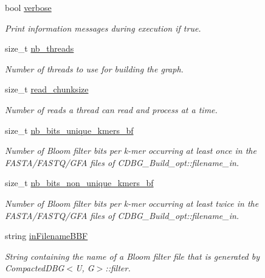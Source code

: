 \begin{DoxyCompactItemize}
\item 
bool \hyperlink{structCDBG__Build__opt_ae904b922a07485a809f5bd89f9100225}{verbose}
\begin{DoxyCompactList}\small\item\em Print information messages during execution if true. \end{DoxyCompactList}\item 
size\+\_\+t \hyperlink{structCDBG__Build__opt_a788622fc88a1957d46d84feab8086d0c}{nb\+\_\+threads}
\begin{DoxyCompactList}\small\item\em Number of threads to use for building the graph. \end{DoxyCompactList}\item 
size\+\_\+t \hyperlink{structCDBG__Build__opt_ae788b89a3eeca15411c1c01d1e47736e}{read\+\_\+chunksize}
\begin{DoxyCompactList}\small\item\em Number of reads a thread can read and process at a time. \end{DoxyCompactList}\item 
size\+\_\+t \hyperlink{structCDBG__Build__opt_a863fc8d612ec6fa3ba54ac970a83065c}{nb\+\_\+bits\+\_\+unique\+\_\+kmers\+\_\+bf}
\begin{DoxyCompactList}\small\item\em Number of Bloom filter bits per k-\/mer occurring at least once in the F\+A\+S\+T\+A/\+F\+A\+S\+T\+Q/\+G\+FA files of C\+D\+B\+G\+\_\+\+Build\+\_\+opt\+::filename\+\_\+in. \end{DoxyCompactList}\item 
size\+\_\+t \hyperlink{structCDBG__Build__opt_a0923610123fa39ddabff3863149b9636}{nb\+\_\+bits\+\_\+non\+\_\+unique\+\_\+kmers\+\_\+bf}
\begin{DoxyCompactList}\small\item\em Number of Bloom filter bits per k-\/mer occurring at least twice in the F\+A\+S\+T\+A/\+F\+A\+S\+T\+Q/\+G\+FA files of C\+D\+B\+G\+\_\+\+Build\+\_\+opt\+::filename\+\_\+in. \end{DoxyCompactList}\item 
string \hyperlink{structCDBG__Build__opt_aede0acb7ddd4b5bf7c6c539a86461d15}{in\+Filename\+B\+BF}
\begin{DoxyCompactList}\small\item\em String containing the name of a Bloom filter file that is generated by Compacted\+D\+B\+G$<$\+U, G$>$\+::filter. \end{DoxyCompactList}\item 

\end{DoxyCompactItemize}
